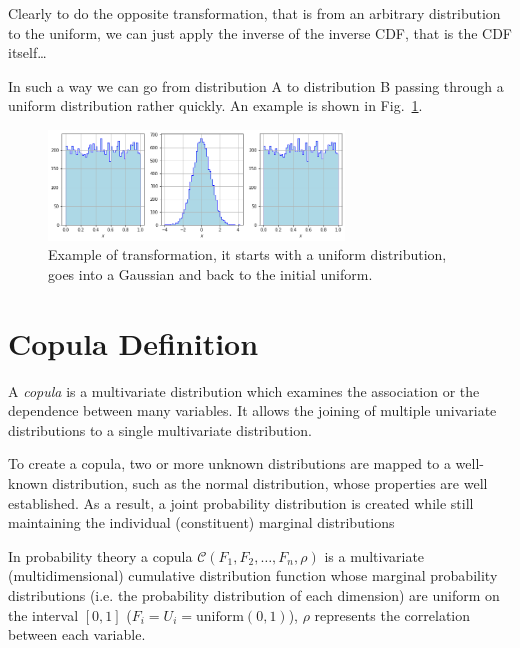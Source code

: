 Clearly to do the opposite transformation, that is from an arbitrary distribution to the uniform, we can just apply the inverse of the inverse CDF, that is the CDF itself\ldots

In such a way we can go from distribution A to distribution B passing through a uniform distribution rather quickly. An example is shown in Fig.~\ref{fig:a_to_b_to_a}.

\begin{figure}[htbp]
	\centering
	\includegraphics[width=0.7\textwidth]{figures/a_to_b_to_a}
	\caption{Example of transformation, it starts with a uniform distribution, goes into a Gaussian and back to the initial uniform.}
	\label{fig:a_to_b_to_a}
\end{figure}
\newpage

\section{Copula Definition}
\label{copula}

A \emph{copula} is a multivariate distribution which examines the association or the dependence between many variables. It allows the joining of multiple univariate distributions to a single multivariate distribution.


To create a copula, two or more unknown distributions are mapped to a well-known distribution, such as the normal distribution, whose properties are well established. As a result, a joint probability distribution is created while still maintaining the individual (constituent) marginal distributions

In probability theory a copula $\mathcal{C}(F_1, F_2, \ldots, F_n, \rho)$ is a multivariate (multidimensional) cumulative distribution function whose marginal probability distributions (i.e. the probability distribution of each dimension) are uniform on the interval $[0, 1]$ ($F_i = U_i =\mathrm{uniform}(0,1)$), \(\rho\) represents the correlation between each variable.

